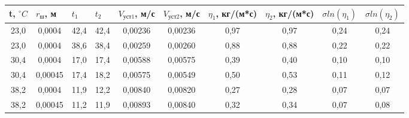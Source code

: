 \documentclass[12pt,a4paper]{article}
\begin{document}
\begin{enumerate}
\begin{table}[h!]
\begin{tabular}{|c|c|c|c|c|c|c|c|c|c|}
\hline
\multicolumn{1}{|l|}{t, $^\circ C$} & \multicolumn{1}{l|}{$r_ш$, м} & \multicolumn{1}{l|}{$t_1$} & \multicolumn{1}{l|}{$t_2$} & \multicolumn{1}{l|}{$V_{уст1}$, м/с} & \multicolumn{1}{l|}{$V_{уст2}$, м/с} & \multicolumn{1}{l|}{$\eta_1$, кг/(м*с)} & \multicolumn{1}{l|}{$\eta_2$, кг/(м*с)} & \multicolumn{1}{l|}{$\sigma ln(\eta _1)$} & \multicolumn{1}{l|}{$\sigma ln(\eta _2)$} \\ \hline
23,0                         & 0,0004                      & 42,4                    & 42,4                    & 0,00236                          & 0,00236                          & 0,97                              & 0,97                              & 0,24                       & 0,24                                               \\ \hline
23,0                         & 0,0004                      & 38,6                    & 38,4                    & 0,00259                          & 0,00260                          & 0,88                              & 0,88                              & 0,22                       & 0,22                                               \\ \hline
30,4                       & 0,0004                      & 17,0                      & 17,4                    & 0,00588                          & 0,00575                          & 0,39                              & 0,40                              & 0,10                       & 0,10                                               \\ \hline
30,4                       & 0,00045                     & 17,4                    & 18,2                    & 0,00575                          & 0,00549                          & 0,50                              & 0,53                              & 0,11                       & 0,12                                               \\ \hline
38,2                       & 0,0004                      & 11,9                    & 12,2                    & 0,00840                          & 0,00820                          & 0,27                              & 0,28                              & 0,07                       & 0,07                                               \\ \hline
38,2                       & 0,00045                     & 11,2                    & 11,9                    & 0,00893                          & 0,00840                          & 0,32                              & 0,34                              & 0,07                       & 0,08                                               \\ \hline

\end{tabular}
\end{table}
\end{enumerate}
\end{document}
